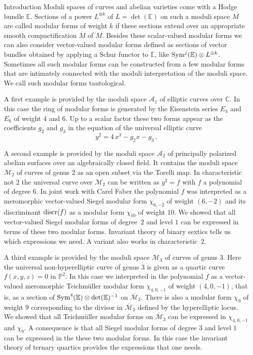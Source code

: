 \documentclass[12pt]{amsart}
\numberwithin{equation}{section}
\def\today{\ifcase\month\or Jan\or Febr\or  Mar\or  Apr\or May\or Jun\or  Jul\or Aug\or  Sep\or  Oct\or Nov\or  Dec\or\fi \space\number\day, \number\year}
\newcommand{\CC}{\mathbb C}
\newcommand{\EE}{\mathbb E}
\newcommand{\PP}{\mathbb P}
\numberwithin{equation}{section}
\theoremstyle{definition}
\theoremstyle{remark}
\begin{document}
\begin{section}{Introduction}\label{sec-intro}
Moduli spaces of curves and abelian varieties come with a Hodge bundle ${\EE}$.
Sections of a power $L^{\otimes k}$ of $L=\det({\EE})$ on such a moduli space $M$
are called modular forms of weight $k$ if these sections extend over an appropriate smooth compactification $\overline{M}$
of $M$. Besides these scalar-valued modular forms we can also consider vector-valued
modular forms defined as sections of vector bundles obtained by applying a Schur functor
to ${\EE}$, like ${\rm Sym}^j({\EE})\otimes L^{\otimes k}$. Sometimes all such modular forms can be constructed from a few
modular forms that are intimately connected with the moduli interpretation of the moduli
space. We call such modular forms tautological. 

A first example is provided by the moduli space $\mathcal{A}_1$ of elliptic curves over ${\CC}$.
In this case the ring of modular forms is generated by the Eisenstein series $E_4$ and $E_6$
of weight $4$ and $6$. Up to a scalar factor these two forms appear as the coefficients
$g_2$ and $g_3$ in the equation of the universal elliptic curve
$$
y^2=4\, x^3-g_2 x -g_3 \, .
$$

A second example is provided by the moduli space $\mathcal{A}_2$ of 
principally polarized abelian surfaces over an algebraically closed field. 
It contains the moduli space $\mathcal{M}_2$ of curves of genus $2$ as an open subset via the Torelli map.
In characteristic not $2$ the universal curve over $\mathcal{M}_2$ can be written as
$y^2=f$ with $f$ a polynomial of degree $6$. In joint work \cite{CFG1,CFG2} with Carel Faber the polynomial $f$ was interpreted as
a meromorphic vector-valued Siegel modular form $\chi_{6,-2}$ of weight $(6,-2)$ 
and its discriminant ${\rm discr}(f)$ 
 as a modular form $\chi_{10}$ of weight $10$. We showed that all  
vector-valued Siegel modular forms of degree~$2$ and level $1$ can be expressed in
terms of these two modular forms.  Invariant theory of binary sextics tells us 
which expressions we need. A variant also works in characteristic~$2$.

A third example is provided by the moduli space $\mathcal{M}_3$ of curves of genus $3$.
Here the universal non-hyperelliptic curve of genus $3$ is given as a quartic curve
$f(x,y,z)=0$ in ${\PP}^2$. In this case we interpreted in \cite{CFG3} the polynomial $f$
as a vector-valued meromorphic Teichm\"uller modular form $\chi_{4,0,-1}$ of weight $(4,0,-1)$,
that is, as 
a section of ${\rm Sym}^4({\EE})\otimes \det({\EE})^{-1}$ on $\overline{\mathcal{M}}_3$. 
There is also a modular form
$\chi_9$ of weight $9$ corresponding to the divisor in $\overline{\mathcal{M}}_3$ defined
by the hyperelliptic locus. We showed that all Teichm\"uller modular forms on 
$\overline{\mathcal{M}}_3$ can be expressed in $\chi_{4,0,-1}$ and $\chi_{9}$. 
A consequence is that all Siegel modular forms of degree $3$ and level $1$ can be expressed
in the these two modular forms.  In this case the invariant theory of ternary quartics
provides the expressions that one needs.


\end{section}
\end{document}
